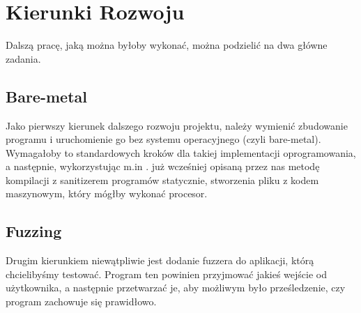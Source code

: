 \documentclass[../main.tex]{subfiles}
\begin{document}
		
	\section{Kierunki Rozwoju}
Dalszą pracę, jaką można byłoby wykonać, można podzielić na dwa główne zadania.

		\subsection{Bare-metal}
 Jako pierwszy kierunek dalszego rozwoju projektu, należy wymienić zbudowanie programu i uruchomienie go bez systemu operacyjnego (czyli bare-metal). Wymagałoby to standardowych kroków dla takiej implementacji oprogramowania, a następnie, wykorzystując m.in . już wcześniej opisaną przez nas metodę kompilacji z sanitizerem programów statycznie, stworzenia pliku z kodem maszynowym, który mógłby wykonać procesor.



		\subsection{Fuzzing}
		Drugim kierunkiem niewątpliwie jest dodanie fuzzera do aplikacji, którą chcielibyśmy testować. Program ten powinien przyjmować jakieś wejście od użytkownika, a następnie przetwarzać je, aby możliwym było prześledzenie, czy program zachowuje się prawidłowo.
\end{document}
